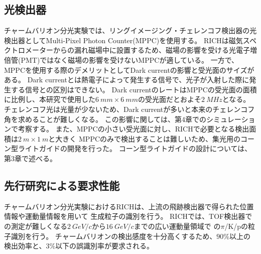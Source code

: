 \subsection{光検出器}
チャームバリオン分光実験では、リングイメージング・チェレンコフ検出器の光検出器としてMulti-Pixel Photon Counter(MPPC)\cite{ref8}を使用する。
RICHは磁気スペクトロメーターからの漏れ磁場中に設置するため、磁場の影響を受ける光電子増倍管(PMT)ではなく磁場の影響を受けないMPPCが適している。
一方で、MPPCを使用する際のデメリットとしてDark currentの影響と受光面のサイズがある。
Dark currentとは熱電子によって発生する信号で、光子が入射した際に発生する信号との区別はできない。
Dark currentのレートはMPPCの受光面の面積に比例し、本研究で使用した$\SI{6}{mm}\times\SI{6}{mm}$の受光面だとおよそ$\SI{2}{MHz}$となる。
チェレンコフ光は光量が少ないため、Dark currentが多いと本来のチェレンコフ角を求めることが難しくなる。
この影響に関しては、第4章でのシミュレーションで考察する。
また、MPPCの小さい受光面に対し、RICHで必要となる検出面積は$\SI{2}{m}\times\SI{1}{m}$と大きく
MPPCのみで検出することは難しいため、集光用のコーン型ライトガイドの開発を行った。
コーン型ライトガイドの設計については、第3章で述べる。

\subsection{先行研究による要求性能}
チャームバリオン分光実験におけるRICHは、上流の飛跡検出器で得られた位置情報や運動量情報を用いて
生成粒子の識別を行う。
RICHでは、TOF検出器での測定が難しくなる$\SI{2}{GeV/c}$から$\SI{16}{GeV/c}$までの広い運動量領域で
の$\pi$/K/pの粒子識別を行う。
チャームバリオンの検出感度を十分高くするため、$90\%$以上の検出効率と、$3\%$以下の誤識別率が要求される。
